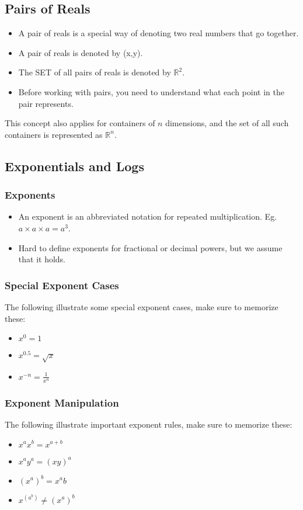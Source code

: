 \subsection{Pairs of Reals}

\begin{itemize}
    \item A pair of reals is a special way of denoting two real numbers that go together.
    \item A pair of reals is denoted by (x,y).
    \item The SET of all pairs of reals is denoted by $\mathbb{R}^2$.
    \item Before working with pairs, you need to understand what each point in the pair represents.
\end{itemize}
This concept also applies for containers of $n$ dimensions, and the set of all such containers is represented as $\mathbb{R}^n$.
\subsection{Exponentials and Logs}
\subsubsection{Exponents}
\begin{itemize}
    \item An exponent is an abbreviated notation for repeated multiplication. Eg. $a\times a \times a = a^3$.
    \item Hard to define exponents for fractional or decimal powers, but we assume that it holds.
\end{itemize}
\subsubsection{Special Exponent Cases}
The following illustrate some special exponent cases, make sure to memorize these:
\begin{itemize}
    \item $x^0=1$
    \item $x^0.5=\sqrt{x}$
    \item $x^{-n}=\frac{1}{x^n}$
\end{itemize}
\subsubsection{Exponent Manipulation}
The following illustrate important exponent rules, make sure to memorize these:
\begin{itemize}
    \item $x^ax^b=x^{a+b}$
    \item $x^ay^a=(xy)^a$
    \item $(x^a)^b=x^ab$
    \item $x^(a^b)\neq (x^a)^b$
\end{itemize}
